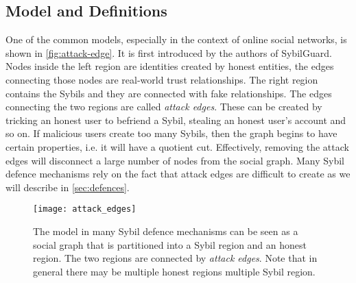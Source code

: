 
\subsection{Model and Definitions}
One of the common models, especially in the context of online social networks,
is shown in \autoref{fig:attack-edge}. It is first introduced by the authors of
SybilGuard\cite{yu2006sybilguard}. Nodes inside the left region are identities
created by honest entities, the edges connecting those nodes are real-world
trust relationships. The right region contains the Sybils and they are connected
with fake relationships. The edges connecting the two regions are called
\emph{attack edges}. These can be created by tricking an honest user to befriend
a Sybil, stealing an honest user's account and so on. If malicious users create
too many Sybils, then the graph begins to have certain properties, i.e. it will
have a quotient cut. Effectively, removing the attack edges will disconnect a
large number of nodes from the social graph. Many Sybil defence mechanisms rely
on the fact that attack edges are difficult to create as we will describe in
\autoref{sec:defences}. 

\begin{figure}
  \centering
  \texttt{[image: attack\_edges]}
  \caption{The model in many Sybil defence mechanisms can be seen as a social
    graph that is partitioned into a Sybil region and an honest region. The two
    regions are connected by \emph{attack edges}. Note that in general there may
    be multiple honest regions multiple Sybil region. }
  \label{fig:attack-edge}
\end{figure}


